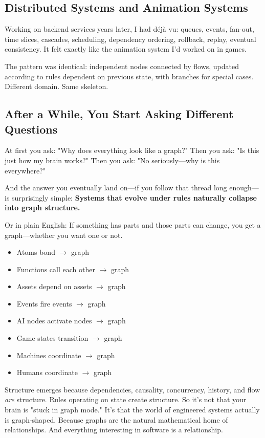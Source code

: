 \subsection{Distributed Systems and Animation Systems}
Working on backend services years later, I had déjà vu: queues, events, fan-out, time slices, cascades, scheduling, dependency ordering, rollback, replay, eventual consistency. It felt exactly like the animation system I'd worked on in games.

The pattern was identical: independent nodes connected by flows, updated according to rules dependent on previous state, with branches for special cases. Different domain. Same skeleton.

\subsection{After a While, You Start Asking Different Questions}
At first you ask: "Why does everything look like a graph?" Then you ask: "Is this just how my brain works?" Then you ask: "No seriously—why is this everywhere?"

And the answer you eventually land on—if you follow that thread long enough—is surprisingly simple: \textbf{Systems that evolve under rules naturally collapse into graph structure.}

Or in plain English: If something has parts and those parts can change, you get a graph—whether you want one or not.
\begin{itemize}
    \item Atoms bond $\rightarrow$ graph
    \item Functions call each other $\rightarrow$ graph
    \item Assets depend on assets $\rightarrow$ graph
    \item Events fire events $\rightarrow$ graph
    \item AI nodes activate nodes $\rightarrow$ graph
    \item Game states transition $\rightarrow$ graph
    \item Machines coordinate $\rightarrow$ graph
    \item Humans coordinate $\rightarrow$ graph
\end{itemize}

Structure emerges because dependencies, causality, concurrency, history, and flow \textit{are} structure. Rules operating on state create structure. So it's not that your brain is "stuck in graph mode." It's that the world of engineered systems actually is graph-shaped. Because graphs are the natural mathematical home of relationships. And everything interesting in software is a relationship.

